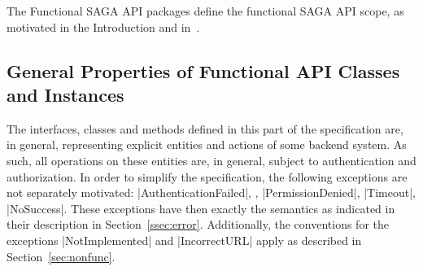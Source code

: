  \label{sec:func}
 
  The Functional SAGA API packages define the functional SAGA
  API scope, as motivated in the Introduction and
  in~\cite{saga-req}.  
 
  \subsection*{General Properties of Functional API Classes and
  Instances}
  
  The interfaces, classes and methods defined in this part of
  the specification are, in general, representing explicit
  entities and actions of some backend system.  As such, all
  operations on these entities are, in general, subject to
  authentication and authorization.  In order
  to simplify the specification, the following exceptions are
  not separately motivated: |AuthenticationFailed|,
  , |PermissionDenied|, |Timeout|,
  |NoSuccess|.  These exceptions have then exactly the semantics
  as indicated in their description in Section~\ref{ssec:error}.
  Additionally, the conventions for the exceptions
  |NotImplemented| and |IncorrectURL| apply as described in
  Section~\ref{sec:nonfunc}.
 
  \newpage
 
